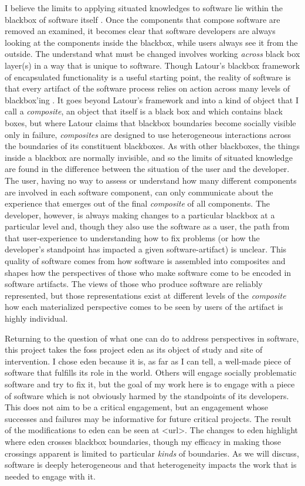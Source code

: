 \documentclass[a4paper,man,natbib]{apa6}
\begin{document}
   I believe the limits to applying situated knowledges to software lie within the blackbox of software itself \citep{Latour1999-ui}. Once the components that compose software are removed an examined, it becomes clear that software developers are always looking at the components inside the blackbox, while users always see it from the outside. The understand what must be changed involves working \textit{across} black box layer(s) in a way that is unique to software. Though Latour's blackbox framework of encapsulated functionality is a useful starting point, the reality of software is that every artifact of the software process relies on action across many levels of blackbox'ing \citep{Latour1999-ui}. It goes beyond Latour's framework and into a kind of object that I call a \textit{composite}, an object that itself is a black box and which contains black boxes, but where Latour claims that blackbox boundaries become socially visible only in failure, \textit{composites} are designed to use heterogeneous interactions across the boundaries of its constituent blackboxes. As with other blackboxes, the things inside a blackbox are normally invisible, and so the limits of situated knowledge are found in the difference between the situation of the user and the developer. The user, having no way to assess or understand how many different components are involved in each software component, can only communicate about the experience that emerges out of the final \textit{composite} of all components. The developer, however, is always making changes to a particular blackbox at a particular level and, though they also use the software as a user, the path from that user-experience to understanding how to fix problems (or how the developer's standpoint has impacted a given software-artifact) is unclear. This quality of software comes from how software is assembled into composites and shapes how the perspectives of those who make software come to be encoded in software artifacts. The views of those who produce software are reliably represented, but those representations exist at different levels of the \textit{composite} how each materialized perspective comes to be seen by users of the artifact is highly individual.

   Returning to the question of what one can do to address perspectives in software, this project takes the \acrfull{foss} project \acrfull{eden} as its object of study and site of intervention. I chose \acrshort{eden} because it is, as far as I can tell, a well-made piece of software that fulfills its role in the world. Others will engage socially problematic software and try to fix it, but the goal of my work here is to engage with a piece of software which is not obviously harmed by the standpoints of its developers. This does not aim to be a critical engagement, but an engagement whose successes and failures may be informative for future critical projects. The result of the modifications to \acrshort{eden} can be seen at <url>. The changes to \acrshort{eden} highlight where \acrshort{eden} crosses blackbox boundaries, though my efficacy in making those crossings apparent is limited to particular \textit{kinds} of boundaries. As we will discuss, software is deeply heterogeneous and that heterogeneity impacts the work that is needed to engage with it. 
\end{document}

